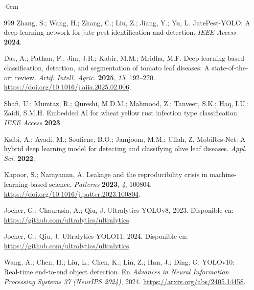 \documentclass[sensors,article,submit,pdftex,moreauthors]{Definitions/mdpi}
\begin{document}
\begin{adjustwidth}{-\extralength}{0cm}
\begin{thebibliography}{999}
Zhang, S.; Wang, H.; Zhang, C.; Liu, Z.; Jiang, Y.; Yu, L. JutePest-YOLO: A deep learning network for jute pest identification and detection. {\em IEEE Access} {\bf 2024}.

Das, A.; Pathan, F.; Jim, J.R.; Kabir, M.M.; Mridha, M.F. Deep learning-based classification, detection, and segmentation of tomato leaf diseases: A state-of-the-art review. {\em Artif. Intell. Agric.} {\bf 2025}, {\em 15}, 192--220. \url{https://doi.org/10.1016/j.aiia.2025.02.006}.

Shafi, U.; Mumtaz, R.; Qureshi, M.D.M.; Mahmood, Z.; Tanveer, S.K.; Haq, I.U.; Zaidi, S.M.H. Embedded AI for wheat yellow rust infection type classification. {\em IEEE Access} {\bf 2023}.

Ksibi, A.; Ayadi, M.; Soufiene, B.O.; Jamjoom, M.M.; Ullah, Z. MobiRes-Net: A hybrid deep learning model for detecting and classifying olive leaf diseases. {\em Appl. Sci.} {\bf 2022}.

Kapoor, S.; Narayanan, A. Leakage and the reproducibility crisis in machine-learning-based science. {\em Patterns} {\bf 2023}, {\em 4}, 100804. \url{https://doi.org/10.1016/j.patter.2023.100804}.

Jocher, G.; Chaurasia, A.; Qiu, J. Ultralytics YOLOv8, 2023. Disponible en: \url{https://github.com/ultralytics/ultralytics}.

Jocher, G.; Qiu, J. Ultralytics YOLO11, 2024. Disponible en: \url{https://github.com/ultralytics/ultralytics}.

Wang, A.; Chen, H.; Liu, L.; Chen, K.; Lin, Z.; Han, J.; Ding, G. YOLOv10: Real-time end-to-end object detection. En {\em Advances in Neural Information Processing Systems 37 (NeurIPS 2024)}, 2024. \url{https://arxiv.org/abs/2405.14458}.



\end{thebibliography}
\end{adjustwidth}
\end{document}
